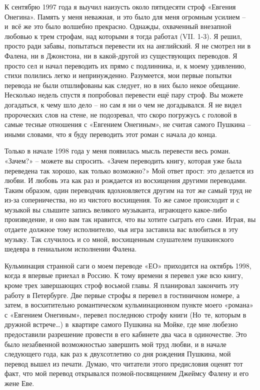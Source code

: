 \documentclass[../main.tex]{subfiles}
\begin{document}
К сентябрю 1997 года я выучил наизусть около пятидесяти строф «Евгения Онегина». Память у меня неважная, и это было для меня огромным усилием \--- и~всё же это было волшебно прекрасно. Однажды, охваченный внезапной любовью к трем строфам, над которыми я тогда работал (VII. 1-3). Я решил, просто ради забавы, попытаться перевести их на английский. Я не смотрел ни в Фалена, ни в Джонстона, ни в какой-другой из существующих переводов. Я просто сел и начал переводить их прямо с подлинника, и, к моему удивлению, стихи полились легко и непринужденно. Разумеется, мои первые попытки перевода не были отшлифованы как следует, но в них было некое обещание. Несколько недель спустя я попробовал перевести ещё пару строф. Вы можете догадаться, к чему шло дело \--- но сам я ни о чем не догадывался. Я не видел пророческих слов на стене, не подозревал, что скоро погружусь с головой в самые тесные отношения с «Евгением Онегиным», не считая самого Пушкина \--- иными словами, что я буду переводить этот роман с начала до конца.

Только в начале 1998 года у меня появилась мысль перевести весь роман.
«Зачем?» \--- можете вы спросить. «Зачем переводить книгу, которая уже была переведена так хорошо, как только возможно?» Мой ответ прост: это делается из любви. И любовь эта как раз и рождается из восхищения другими переводами. Таким образом, один переводчик вдохновляется другим на тот же самый труд не из-за соперничества, но из чистого восхищения. То же самое происходит и с музыкой вы слышите запись великого музыканта, играющего какое-либо произведение, и оно вам так нравится, что вы хотите сыграть его сами. Играя, вы отдаете должное тому исполнителю, чья игра заставила вас влюбиться в эту музыку. Так случилось и со мной, восхищенным слушателем пушкинского шедевра в гениальном исполнении Фалена.

Кульминация странной саги о моем переводе «ЕО» приходится на октябрь 1998, когда я впервые приехал в Россию. К тому времени я перевел уже всю книгу, кроме трех завершающих строф восьмой главы. Я планировал закончить эту работу в Петербурге. Две первые строфы я перевел в гостиничном номере, а затем, в восхитительно романтическом кульминационном пункте моего «романа» с «Евгением Онегиным», перевел последнюю строфу книги (Но~те, которым в дружной встрече\ldots) в~квартире самого Пушкина на Мойке, где мне любезно предоставили разрешение провести в его кабинете два часа в одиночестве. Это было незабвенной возможностью завершить мой труд любви, и в начале следующего года, как раз к двухсотлетию со дня рождения Пушкина, мой перевод вышел из печати. Думаю, что читатели этого предисловия оценят тот факт, что мой перевод открывался поэмой-посвящением Джеймсу Фалену и его жене Еве.
\end{document}
